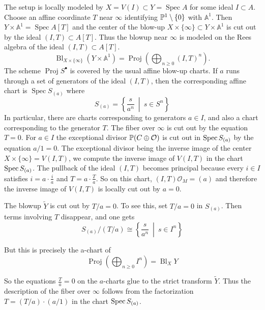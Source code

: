 \documentclass[12pt]{article}
\begin{document}
The setup is locally modeled by $X = V(I) \subset Y = \operatorname{Spec}A$ for some ideal \(I\subset A\). Choose an affine coordinate \(T\) near $\infty$ identifying $\mathbb P^1\setminus\set{0}$ with \(\mathbb A^1\).
Then $Y\times \mathbb A^1=\operatorname{Spec}A[T]$
and the center of the blow-up $X\times\{\infty\}\subset Y\times\mathbb A^1$
is cut out by the ideal $(I,T)\subset A[T]$. 
Thus the blowup near $\infty$ is modeled on the Rees algebra of the ideal $(I,T) \subset A[T]$.
\[
    \operatorname{Bl}_{X\times\{\infty\}}(Y\times\mathbb A^1)
    =
    \operatorname{Proj}
    \left(
        \bigoplus_{n\geq 0}(I,T)^n
    \right).
\]The scheme $\operatorname{Proj}S^\bullet$
is covered by the usual affine blow-up charts. If \(a\) runs through a set of
generators of the ideal \((I,T)\), then the corresponding affine chart is $\operatorname{Spec}S_{(a)}$
where
\[
    S_{(a)}
    =
    \left\{
        \frac{s}{a^n}
        \ \middle|\
        s\in S^n
    \right\}
\]
In particular, there are charts corresponding to generators \(a\in I\), and
also a chart corresponding to the generator \(T\). The fiber over \(\infty\) is cut out by the equation \(T=0\).  For $a\in I$ the exceptional divisor $\P(C\oplus \mathcal O)$ is cut out in $\Spec S_{(a)}$ by the equation $a/1 = 0$. The exceptional divisor being the inverse image of the center $X\times\{\infty\}=V(I,T)$, we compute the inverse image of $V(I,T)$ in the chart $\Spec S_{(a)}$. The pullback of the ideal $(I,T)$ becomes principal because every $i\in I$ satisfies $i=a\cdot \frac ia$
and $T=a\cdot \frac Ta$. So on this chart, $(I,T)\mathcal O_M=(a)$ and therefore the inverse image of $V(I,T)$ is locally cut out by $a=0$.

The blowup $\tilde Y$ is cut out by $T/a=0$. To see this, set $T/a=0$ in $S_{(a)}$. Then terms involving $T$ disappear, and one gets
\[
S_{(a)}/(T/a)
\cong
\left\{
\frac{s}{a^n}\ \middle|\ s\in I^n
\right\}\]

But this is precisely the a-chart of
\[
\operatorname{Proj}\left(\bigoplus_{n\ge 0}I^n\right)
=
\operatorname{Bl}_XY\]

So the equations $\frac Ta=0$ on the $a$-charts glue to the strict transform $\widetilde Y$. Thus the description of the fiber over \(\infty\) follows from the factorization $T = (T/a)\cdot (a/1)$ in the chart \(\Spec S_{(a)}\).
\end{document}
